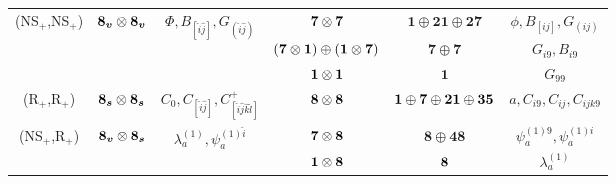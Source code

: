 {\begin{tabular}{|cccccc|}
    \multicolumn{1}{|c|}{\multirow{3}{*}{(NS$_+$,NS$_+$)}} & \multicolumn{1}{c|}{\multirow{3}{*}{$\boldsymbol{8_v} \otimes \boldsymbol{8_v}$}} & \multicolumn{1}{c|}{\multirow{3}{*}{$\Phi, B_{[\hat{i}\hat{j}]}, G_{(\hat{i}\hat{j})}$}} & \multicolumn{1}{c|}{$\boldsymbol{7} \otimes \boldsymbol{7}$}                          & \multicolumn{1}{c|}{$\boldsymbol{1} \oplus \boldsymbol{21}\oplus\boldsymbol{27}$}     & $\phi, B_{[ij]}, G_{(ij)}$           \\ \cline{4-6} 
    \multicolumn{1}{|c|}{}                                 & \multicolumn{1}{c|}{}                                 & \multicolumn{1}{c|}{}                                                                    & \multicolumn{1}{c|}{$(\boldsymbol{7} \otimes \boldsymbol{1}) \oplus (\boldsymbol{1} \otimes \boldsymbol{7})$} & \multicolumn{1}{c|}{$\boldsymbol{7}\oplus \boldsymbol{7}$}                            & $G_{i9}, B_{i9}$                     \\ \cline{4-6} 
    \multicolumn{1}{|c|}{}                                 & \multicolumn{1}{c|}{}                                 & \multicolumn{1}{c|}{}                                                                    & \multicolumn{1}{c|}{$\boldsymbol{1} \otimes \boldsymbol{1}$}                                  & \multicolumn{1}{c|}{$\boldsymbol{1}$}                                                 & $G_{99}$                             \\ \hline
    \multicolumn{1}{|c|}{(R$_+$,R$_+$)}                    & \multicolumn{1}{c|}{$\boldsymbol{8_s} \otimes \boldsymbol{8_s}$}                  & \multicolumn{1}{c|}{$C_0, C_{[\hat{i}\hat{j}]}, C_{[\hat{i}\hat{j}\hat{k}\hat{l}]}^+$}   & \multicolumn{1}{c|}{$\boldsymbol{8} \otimes \boldsymbol{8}$}                          & \multicolumn{1}{c|}{$\boldsymbol{1} \oplus \boldsymbol{7} \oplus \boldsymbol{21} \oplus \boldsymbol{35}$} & $a, C_{i9}, C_{ij}, C_{ijk9}$        \\ \hline
    \multicolumn{1}{|c|}{\multirow{2}{*}{(NS$_+$,R$_+$)}}  & \multicolumn{1}{c|}{\multirow{2}{*}{$\boldsymbol{8_v} \otimes \boldsymbol{8_s}$}} & \multicolumn{1}{c|}{\multirow{2}{*}{${\lambda}_a^{(1)}, {\psi}^{(1)\hat{i}}_a$}}         & \multicolumn{1}{c|}{$\boldsymbol{7} \otimes \boldsymbol{8}$}                          & \multicolumn{1}{c|}{$\boldsymbol{8} \oplus\boldsymbol{48}$}                           & $\psi^{(1)9}_a, \psi^{(1)i}_a$       \\ \cline{4-6} 
    \multicolumn{1}{|c|}{}                                 & \multicolumn{1}{c|}{}                                 & \multicolumn{1}{c|}{}                                                                    & \multicolumn{1}{c|}{$\boldsymbol{1} \otimes \boldsymbol{8}$}                              & \multicolumn{1}{c|}{$\boldsymbol{8}$}                                                         & $\lambda^{(1)}_a$                    \\ \hline

\end{tabular}}
